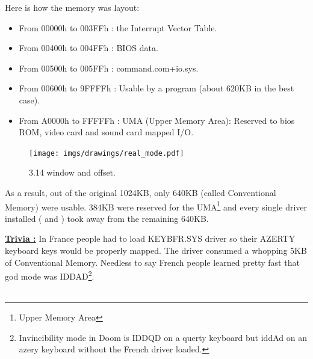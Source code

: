 \documentclass[book.tex]{subfiles}
\begin{document}
  \bigskip
Here is how the memory was layout: \\
\begin{itemize}
\item From 00000h to 003FFh : the Interrupt Vector Table.
\item From 00400h to 004FFh : BIOS data.
\item From 00500h to 005FFh : command.com+io.sys.
\item From 00600h to 9FFFFh : Usable by a program (about 620KB in the best case). 
\item From A0000h to FFFFFh : UMA (Upper Memory Area): Reserved to bios ROM, video card and sound card mapped I/O.
\end{itemize}

\begin{figure}[H]
\centering
\texttt{[image: imgs/drawings/real\_mode.pdf]}

\caption{3.14 window and offset.}
\label{fig:fp_internals}
\end{figure}


As a result, out of the original 1024KB, only 640KB (called Conventional Memory) were usable. 384KB were reserved for the UMA\footnote{Upper Memory Area} and every single driver installed ( and )  took away from the remaining 640KB.

\bigskip

\textbf{\underline{Trivia :}}  In France people had to load KEYBFR.SYS driver so their AZERTY keyboard keys would be properly mapped. The driver consumed a whopping 5KB of Conventional Memory. Needless to say French people learned pretty fast that god mode was IDDAD\footnote{Invincibility mode in Doom is IDDQD on a querty keyboard but iddAd on an azery keyboard without the French driver loaded.}.\\
\\
\end{document}
